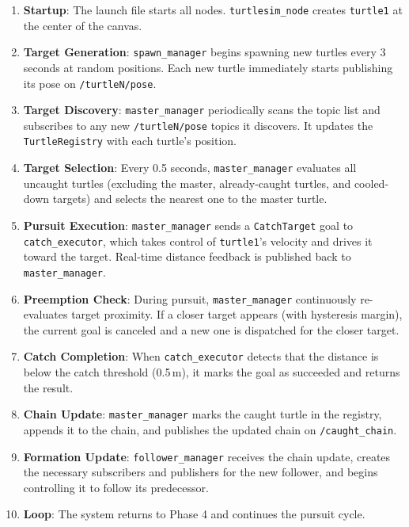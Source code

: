 \documentclass[12pt,a4paper]{article}
\begin{document}
\begin{enumerate}[label=\textbf{Phase \arabic*:}]
  \item \textbf{Startup}: The launch file starts all nodes. \texttt{turtlesim\_node} creates \texttt{turtle1} at the center of the canvas.

  \item \textbf{Target Generation}: \texttt{spawn\_manager} begins spawning new turtles every 3 seconds at random positions. Each new turtle immediately starts publishing its pose on \texttt{/turtleN/pose}.

  \item \textbf{Target Discovery}: \texttt{master\_manager} periodically scans the topic list and subscribes to any new \texttt{/turtleN/pose} topics it discovers. It updates the \texttt{TurtleRegistry} with each turtle's position.

  \item \textbf{Target Selection}: Every 0.5 seconds, \texttt{master\_manager} evaluates all uncaught turtles (excluding the master, already-caught turtles, and cooled-down targets) and selects the nearest one to the master turtle.

  \item \textbf{Pursuit Execution}: \texttt{master\_manager} sends a \texttt{CatchTarget} goal to \texttt{catch\_executor}, which takes control of \texttt{turtle1}'s velocity and drives it toward the target. Real-time distance feedback is published back to \texttt{master\_manager}.

  \item \textbf{Preemption Check}: During pursuit, \texttt{master\_manager} continuously re-evaluates target proximity. If a closer target appears (with hysteresis margin), the current goal is canceled and a new one is dispatched for the closer target.

  \item \textbf{Catch Completion}: When \texttt{catch\_executor} detects that the distance is below the catch threshold (0.5\,m), it marks the goal as succeeded and returns the result.

  \item \textbf{Chain Update}: \texttt{master\_manager} marks the caught turtle in the registry, appends it to the chain, and publishes the updated chain on \texttt{/caught\_chain}.

  \item \textbf{Formation Update}: \texttt{follower\_manager} receives the chain update, creates the necessary subscribers and publishers for the new follower, and begins controlling it to follow its predecessor.

  \item \textbf{Loop}: The system returns to Phase 4 and continues the pursuit cycle.
\end{enumerate}
\end{document}
